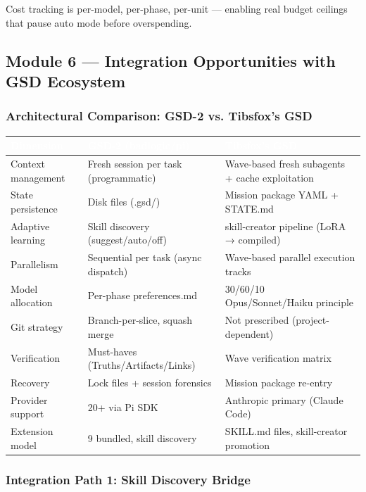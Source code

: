 \documentclass[11pt,letterpaper]{article}
\newcommand{\tableheader}[1]{\textbf{\sffamily\textcolor{white}{#1}}}
\begin{document}
Cost tracking is per-model, per-phase, per-unit --- enabling real budget ceilings that pause auto mode before overspending.

\subsection{Module 6 --- Integration Opportunities with GSD Ecosystem}

\subsubsection{Architectural Comparison: GSD-2 vs. Tibsfox's GSD}

\begin{center}
\begin{tabularx}{\textwidth}{L{4cm}L{4.5cm}L{4.5cm}}
\toprule
{}
\tableheader{Dimension} & \tableheader{GSD-2 (badlogic/pi)} & \tableheader{Tibsfox's GSD} \\
\midrule
Context management & Fresh session per task (programmatic) & Wave-based fresh subagents + cache exploitation \\
State persistence & Disk files (.gsd/) & Mission package YAML + STATE.md \\
Adaptive learning & Skill discovery (suggest/auto/off) & skill-creator pipeline (LoRA → compiled) \\
Parallelism & Sequential per task (async dispatch) & Wave-based parallel execution tracks \\
Model allocation & Per-phase preferences.md & 30/60/10 Opus/Sonnet/Haiku principle \\
Git strategy & Branch-per-slice, squash merge & Not prescribed (project-dependent) \\
Verification & Must-haves (Truths/Artifacts/Links) & Wave verification matrix \\
Recovery & Lock files + session forensics & Mission package re-entry \\
Provider support & 20+ via Pi SDK & Anthropic primary (Claude Code) \\
Extension model & 9 bundled, skill discovery & SKILL.md files, skill-creator promotion \\
\bottomrule
\end{tabularx}
\end{center}

\subsubsection{Integration Path 1: Skill Discovery Bridge}
\end{document}
